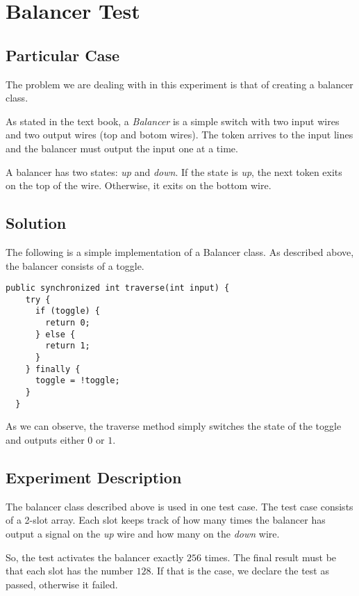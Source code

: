 \section{\textbf{Balancer Test}}
\subsection{Particular Case}
\par
The problem we are dealing with in this experiment is that of creating a 
balancer class.
\par
As stated in the text book, a \textit{Balancer} is a simple switch with two
input wires and two output wires (top and botom wires). The token arrives to
the input lines and the balancer must output the input one at a time.
\par
A balancer has two states: \textit{up} and \textit{down}. If the state is
\textit{up}, the next token exits on the top of the wire. Otherwise, it exits
on the bottom wire.
\par
\subsection{Solution}
\par
The following is a simple implementation of a Balancer
class. As described above, the balancer consists of a
toggle. 
\par
\hfill
\begin{lstlisting}[style=numbers]
  public synchronized int traverse(int input) {
    try {
      if (toggle) {
        return 0;
      } else {
        return 1;
      }
    } finally {
      toggle = !toggle;
    }
  }
\end{lstlisting}
\hfill
\par
As we can observe, the traverse method simply switches the state of the toggle
and outputs either $0$ or $1$. 
\subsection{Experiment Description}
\par
The balancer class described above is used in one test case. The test case
consists of a 2-slot array. Each slot keeps track of how many times the
balancer has output a signal on the \textit{up} wire and how many on the
\textit{down} wire. 
\par
So, the test activates the balancer exactly $256$ times. The final result must be that each slot has the number $128$. If that is the case, we declare the test as passed, otherwise it failed.
\par
